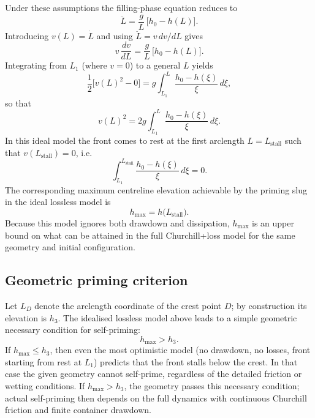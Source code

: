 \documentclass[11pt]{article}
\begin{document}
Under these assumptions the filling-phase equation reduces to
\begin{equation}
  \ddot L = \frac{g}{L}\,\bigl[h_0 - h(L)\bigr].
  \label{eq:ideal-ddotL}
\end{equation}
Introducing $v(L) = \dot L$ and using $\ddot L = v\,dv/dL$ gives
\begin{equation}
  v\,\frac{dv}{dL}
  = \frac{g}{L}\,\bigl[h_0 - h(L)\bigr].
  \label{eq:ideal-vdv}
\end{equation}
Integrating from $L_1$ (where $v=0$) to a general $L$ yields
\begin{equation}
  \frac{1}{2}\bigl[v(L)^2 - 0\bigr]
  = g\int_{L_1}^{L} \frac{h_0 - h(\xi)}{\xi}\,d\xi,
  \label{eq:ideal-int}
\end{equation}
so that
\begin{equation}
  v(L)^2
  = 2g\int_{L_1}^{L} \frac{h_0 - h(\xi)}{\xi}\,d\xi.
  \label{eq:ideal-v2}
\end{equation}
In this ideal model the front comes to rest at the first arclength $L = L_{\text{stall}}$ such that
$v(L_{\text{stall}}) = 0$, i.e.
\begin{equation}
  \int_{L_1}^{L_{\text{stall}}} \frac{h_0 - h(\xi)}{\xi}\,d\xi = 0.
  \label{eq:stall-condition}
\end{equation}
The corresponding maximum centreline elevation achievable by the priming slug in the ideal
lossless model is
\begin{equation}
  h_{\max} = h\bigl(L_{\text{stall}}\bigr).
  \label{eq:hmax}
\end{equation}
Because this model ignores both drawdown and dissipation, $h_{\max}$ is an upper bound on
what can be attained in the full Churchill+loss model for the same geometry and initial
configuration.

\subsection{Geometric priming criterion}

Let $L_D$ denote the arclength coordinate of the crest point $D$; by construction its elevation is $h_3$.
The idealised lossless model above leads to a simple geometric necessary condition for
self-priming:
\begin{equation}
  h_{\max} > h_3.
\end{equation}
If $h_{\max} \le h_3$, then even the most optimistic model (no drawdown, no losses, front
starting from rest at $L_1$) predicts that the front stalls below the crest. In that case the
given geometry cannot self-prime, regardless of the detailed friction or wetting conditions.
If $h_{\max} > h_3$, the geometry passes this necessary condition; actual self-priming then
depends on the full dynamics with continuous Churchill friction and finite container
drawdown.
\end{document}
